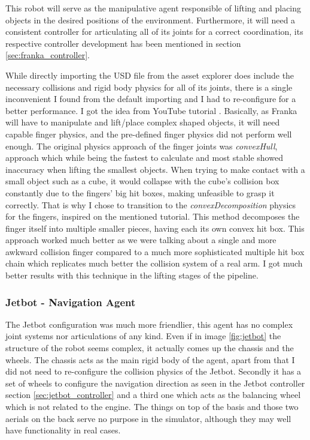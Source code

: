 This robot will serve as the manipulative agent responsible of lifting and placing objects in the desired positions of the environment. Furthermore, it will need a consistent controller for articulating all of its joints for a correct coordination, its respective controller development has been mentioned in section \ref{sec:franka_controller}. 

While directly importing the USD file from the asset explorer does include the necessary collisions and rigid body physics for all of its joints, there is a single inconvenient I found from the default importing and I had to re-configure for a better performance. I got the idea from YouTube tutorial \cite{FrankaConvexDecomposition}. Basically, as Franka will have to manipulate and lift/place complex shaped objects, it will need capable finger physics, and the pre-defined finger physics did not perform well enough. The original physics approach of the finger joints was \textit{convexHull}, approach which while being the fastest to calculate and most stable showed inaccuracy when lifting the smallest objects. When trying to make contact with a small object such as a cube, it would collapse with the cube's collision box constantly due to the fingers' big hit boxes, making unfeasible to grasp it correctly. That is why I chose to transition to the \textit{convexDecomposition} physics for the fingers, inspired on the mentioned tutorial. This method decomposes the finger itself into multiple smaller pieces, having each its own convex hit box. This approach worked much better as we were talking about a single and more awkward collision finger compared to a much more sophisticated multiple hit box chain which replicates much better the collision system of a real arm. I got much better results with this technique in the lifting stages of the pipeline. 

\subsubsection{Jetbot - Navigation Agent}
The Jetbot configuration was much more friendlier, this agent has no complex joint systems nor articulations of any kind. Even if in image \ref{fig:jetbot} the structure of the robot seems complex, it actually comes up the chassis and the wheels. The chassis acts as the main rigid body of the agent, apart from that I did not need to re-configure the collision physics of the Jetbot. Secondly it has a set of wheels to configure the navigation direction as seen in the Jetbot controller section \ref{sec:jetbot_controller} and a third one which acts as the balancing wheel which is not related to the engine. The things on top of the basis and those two aerials on the back serve no purpose in the simulator, although they may well have functionality in real cases. 

